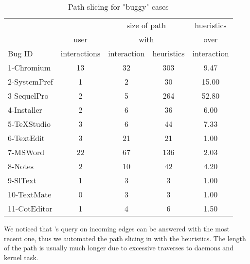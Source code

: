\begin{table}[ht]
\footnotesize
\centering
  \begin{tabularx}{\columnwidth}{l|cccc}
  \hline
 	   &       &\multicolumn{2}{c}{size of path}& hueristics\\
       & user  & \multicolumn{2}{c}{with}  & over \\
Bug ID & interactions & interaction & heuristics  & interaction\\
\hline
\hline
1-Chromium  & 13 & 32 & 303 & 9.47\\
2-SystemPref & 1 & 2 & 30 & 15.00\\
3-SequelPro  & 2 & 5 & 264 & 52.80\\
4-Installer  & 2 & 6 & 36  & 6.00\\
5-TeXStudio  & 3 & 6 & 44  & 7.33\\
6-TextEdit  & 3 & 21 & 21 & 1.00\\
7-MSWord  & 22 & 67 & 136 & 2.03\\
8-Notes  & 2 & 10 & 42 & 4.20\\
9-SlText  & 1 & 3 & 3 & 1.00\\
10-TextMate  & 0 & 3 & 3 & 1.00\\
11-CotEditor  & 1 & 4 & 6 & 1.50\\
\hline
  \end{tabularx}
  \parbox{\columnwidth}
  {\caption{Path slicing for "buggy" cases} 
  	\vspace{-0.3cm}
	{
	We noticed that \xxx's query on incoming edges can be answered with the most
	recent one, thus we automated the path slicing in \xxx with the heuristics.
	The length of the path is usually much longer due to excessive traverses to
	daemons and kernel task.
    }
  \label{table:results}
  }
\end{table}


